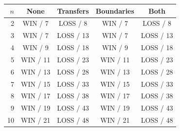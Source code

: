\begin{tabular}{rcccc}
\toprule
$n$ & None & Transfers & Boundaries & Both \\
\midrule
2 & WIN / 7 & LOSS / 8 & WIN / 7 & LOSS / 8 \\
3 & WIN / 7 & LOSS / 13 & WIN / 7 & LOSS / 13 \\
4 & WIN / 9 & LOSS / 18 & WIN / 9 & LOSS / 18 \\
5 & WIN / 11 & LOSS / 23 & WIN / 11 & LOSS / 23 \\
6 & WIN / 13 & LOSS / 28 & WIN / 13 & LOSS / 28 \\
7 & WIN / 15 & LOSS / 33 & WIN / 15 & LOSS / 33 \\
8 & WIN / 17 & LOSS / 38 & WIN / 17 & LOSS / 38 \\
9 & WIN / 19 & LOSS / 43 & WIN / 19 & LOSS / 43 \\
10 & WIN / 21 & LOSS / 48 & WIN / 21 & LOSS / 48 \\
\bottomrule
\end{tabular}
